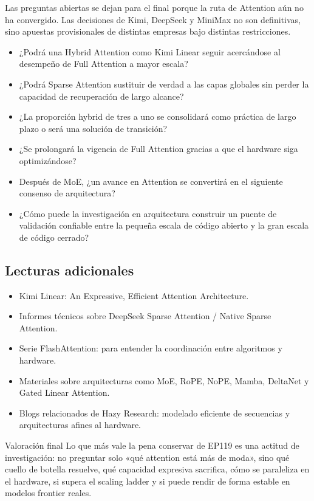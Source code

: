 Las preguntas abiertas se dejan para el final porque la ruta de Attention aún no ha convergido. Las decisiones de Kimi, DeepSeek y MiniMax no son definitivas, sino apuestas provisionales de distintas empresas bajo distintas restricciones.

\begin{itemize}
\item ¿Podrá una Hybrid Attention como Kimi Linear seguir acercándose al desempeño de Full Attention a mayor escala?
\item ¿Podrá Sparse Attention sustituir de verdad a las capas globales sin perder la capacidad de recuperación de largo alcance?
\item ¿La proporción hybrid de tres a uno se consolidará como práctica de largo plazo o será una solución de transición?
\item ¿Se prolongará la vigencia de Full Attention gracias a que el hardware siga optimizándose?
\item Después de MoE, ¿un avance en Attention se convertirá en el siguiente consenso de arquitectura?
\item ¿Cómo puede la investigación en arquitectura construir un puente de validación confiable entre la pequeña escala de código abierto y la gran escala de código cerrado?
\end{itemize}

\subsection{Lecturas adicionales}

\begin{itemize}
\item Kimi Linear: An Expressive, Efficient Attention Architecture.
\item Informes técnicos sobre DeepSeek Sparse Attention / Native Sparse Attention.
\item Serie FlashAttention: para entender la coordinación entre algoritmos y hardware.
\item Materiales sobre arquitecturas como MoE, RoPE, NoPE, Mamba, DeltaNet y Gated Linear Attention.
\item Blogs relacionados de Hazy Research: modelado eficiente de secuencias y arquitecturas afines al hardware.
\end{itemize}

\begin{importantbox}{Valoración final}
Lo que más vale la pena conservar de EP119 es una actitud de investigación: no preguntar solo «qué attention está más de moda», sino qué cuello de botella resuelve, qué capacidad expresiva sacrifica, cómo se paraleliza en el hardware, si supera el scaling ladder y si puede rendir de forma estable en modelos frontier reales.
\end{importantbox}


